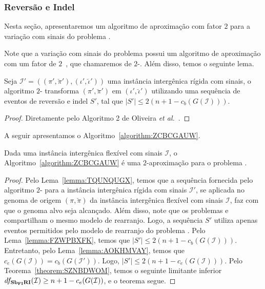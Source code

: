 \subsubsection{Reversão e Indel}

Nesta seção, apresentaremos um algoritmo de aproximação com fator $2$ para a variação com sinais do problema \SbFIRI{}. 

Note que a variação com sinais do problema \SbIRI{} possui um algoritmo de aproximação com um fator de $2$~\cite{2021b-oliveira-etal}, que chamaremos de $2$-\SbIRI{}. Além disso, temos o seguinte lema.

\begin{lemma}\label{lemma:FZWPBXFK}
Seja $\mathcal{I}' = ((\pi',\breve\pi'),(\iota',\breve\iota'))$ uma instância intergênica rígida com sinais, o algoritmo $2$-\SbIRI{} transforma $(\pi',\breve\pi')$ em $(\iota',\breve\iota')$ utilizando uma sequência de eventos de reversão e indel $S'$, tal que $|S'| \le 2({n+1} - c_b(G(\mathcal{I})))$.
\end{lemma}
\begin{proof}
Diretamente pelo Algoritmo 2 de Oliveira \textit{et al.}~\cite{2021b-oliveira-etal}.
\end{proof}

A seguir apresentamos o Algoritmo~\ref{algorithm:ZCBCGAUW}.



\begin{theorem}\label{theorem:UEOFTCVZ}
Dada uma instância intergênica flexível com sinais $\mathcal{I}$, o Algoritmo~\ref{algorithm:ZCBCGAUW} é uma $2$-aproximação para o problema \SbFIRI{}.
\end{theorem}
\begin{proof}
Pelo Lema~\ref{lemma:TQUNQUGX}, temos que a sequência fornecida pelo algoritmo $2$-\SbIRI{} para a instância intergênica rígida com sinais $\mathcal{I'}$, se aplicada no genoma de origem $(\pi,\breve\pi)$ da instância intergênica flexível com sinais $\mathcal{I}$, faz com que o genoma alvo seja alcançado. Além disso, note que os problemas \SbIRI{} e \SbFIRI{} compartilham o mesmo modelo de rearranjo. Logo, a sequência $S'$ utiliza apenas eventos permitidos pelo modelo de rearranjo do problema \SbFIRI{}. Pelo Lema~\ref{lemma:FZWPBXFK}, temos que $|S'| \le 2({n+1} - c_b(G(\mathcal{I})))$. Entretanto, pelo Lema~\ref{lemma:AOKHMVAY}, temos que $c_e(G(\mathcal{I})) = c_b(G(\mathcal{I}'))$. Logo, $|S'| \le 2({n+1} - c_e(G(\mathcal{I})))$. Pelo Teorema~\ref{theorem:SZNBDWOM}, temos o seguinte limitante inferior $df_{\textbf{Sb\textsubscript{FI}RI}}(\mathcal{I}) \ge {n+1} - c_e(G(\mathcal{I}))$, e o teorema segue.
\end{proof}


